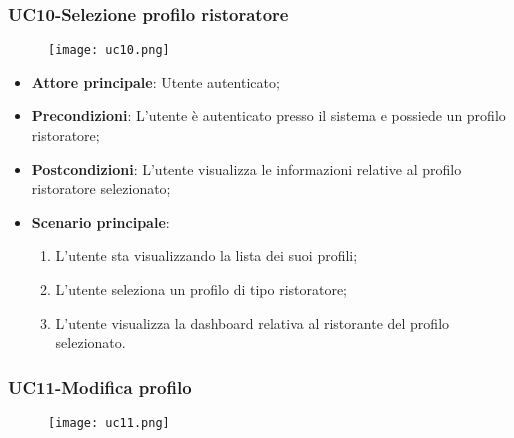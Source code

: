 \pagebreak
\subsubsection{UC10-Selezione profilo ristoratore}
\begin{figure}[h] \texttt{[image: uc10.png]} \end{figure}

\begin{itemize}
\item \textbf{Attore principale}: Utente autenticato;
\item \textbf{Precondizioni}: L'utente è autenticato presso il sistema e possiede un profilo ristoratore;
\item \textbf{Postcondizioni}: L'utente visualizza le informazioni relative al profilo ristoratore selezionato;
\item \textbf{Scenario principale}:
\begin{enumerate}
\item L'utente sta visualizzando la lista dei suoi profili;
\item L'utente seleziona un profilo di tipo ristoratore;
\item L'utente visualizza la dashboard relativa al ristorante del profilo selezionato.
\end{enumerate}
\end{itemize}

\subsubsection{UC11-Modifica profilo}
\begin{figure}[h] \texttt{[image: uc11.png]} \end{figure}

